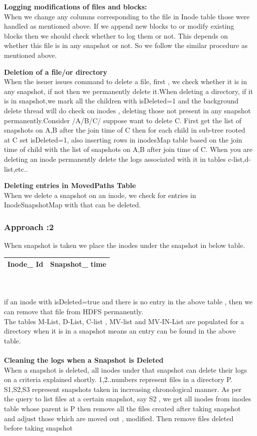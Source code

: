 \textbf{Logging modifications of files and blocks:}\\
When we change any columns corresponding to the file in Inode table those were handled as mentioned above. If we append new blocks to or modify existing blocks then we should check whether to log them or not. This depends on whether this file is in any snapshot or not. So we follow the similar procedure as mentioned above.


\textbf{Deletion of a file/or directory}\\
When the issuer issues command to delete a file, first , we check whether it is in any snapshot, if not then we permanently delete it.When deleting a directory, if it is in snapshot,we mark all the children with isDeleted=1 and the background delete thread will do check on inodes , deleting those not present in any snapshot permanently.Consider /A/B/C/ suppose want to delete C. First get the list of snapshots on A,B after the join time of C then for each child in sub-tree rooted at C set isDeleted=1, also inserting rows in inodesMap table based on the join time of child with the list of snapshots on A,B after join time of C. When you are deleting an inode permanently delete the logs associated with it in tables c-list,d-list,etc..

\textbf{Deleting entries in MovedPaths Table}\\
When we delete a snapshot on an inode, we check for entries in InodeSnapshotMap with that can be deleted.

\subsubsection{Approach :2}
When snapshot is taken we place the inodes under the snapshot in below table.

\begin{tabular}{|c|c|}
\hline
Inode\_ Id&Snapshot\_ time\\
\hline
\end{tabular}\\\\
if an inode with isDeleted=true and there is no entry in the above table , then we can remove that file from HDFS permanently.\\
The tables M-List, D-List, C-list , MV-list and MV-IN-List are populated for a directory when it is in a snapshot means an entry can be found in the above table.\\\\
\textbf{Cleaning the logs when a Snapshot is Deleted}\\
When a snapshot is deleted, all inodes under that snapshot can delete their logs on a criteria explained shortly. 1,2..numbers represent files in a directory P. S1,S2,S3 represent snapshots taken in increasing chronological manner. As per the query to list files at a certain snapshot, say S2 , we get all inodes from inodes table whose parent is P then remove all the files created after taking snapshot and adjust those which are moved out , modified. Then remove files deleted before taking snapshot 

